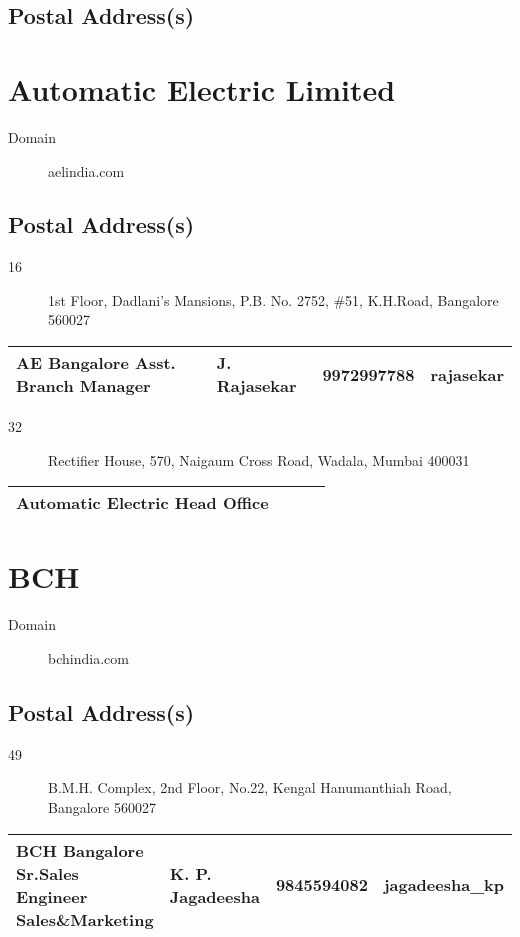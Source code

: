\documentclass[a4paper, 11pt, twoside]{book}
\begin{document}
\subsection*{Postal Address(s)}
\section{Automatic Electric Limited}\label{com:18}
\begin{description}
\item[Domain]aelindia.com
\end{description}
\subsection*{Postal Address(s)}
\begin{description}
\item [16]1st Floor, Dadlani's Mansions, P.B. No. 2752, \#51, K.H.Road, Bangalore 560027
\end{description}
\begin{tabular}{|p{4cm}|p{2cm}|p{2cm}|p{3cm}|}
\hline
AE Bangalore Asst. Branch Manager & J. Rajasekar & 9972997788 & rajasekar \\ \hline
\end{tabular}
\begin{description}
\item [32]Rectifier House, 570, Naigaum Cross Road, Wadala, Mumbai 400031
\end{description}
\begin{tabular}{|p{4cm}|p{2cm}|p{2cm}|p{3cm}|}
\hline
Automatic Electric Head Office & & &  \\ \hline
\end{tabular}
\section{BCH}\label{com:38}
\begin{description}
\item[Domain]bchindia.com
\end{description}
\subsection*{Postal Address(s)}
\begin{description}
\item [49]B.M.H. Complex, 2nd Floor, No.22, Kengal Hanumanthiah Road, Bangalore 560027
\end{description}
\begin{tabular}{|p{4cm}|p{2cm}|p{2cm}|p{3cm}|}
\hline
BCH Bangalore Sr.Sales Engineer Sales\&Marketing & K. P. Jagadeesha & 9845594082 & jagadeesha\_kp \\ \hline
\end{tabular}
\end{document}
